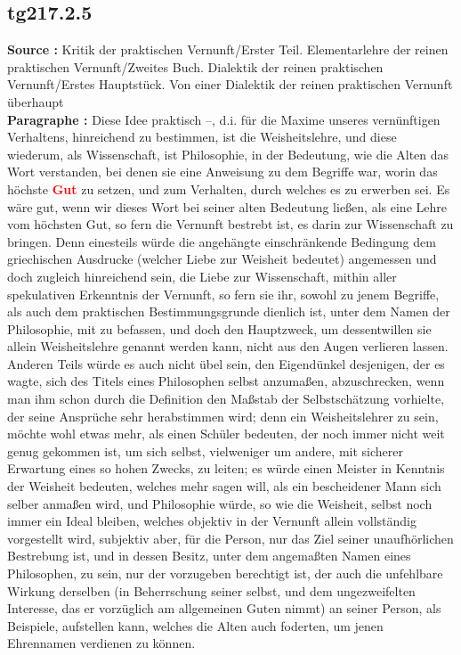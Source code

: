 \documentclass[a4paper,12pt,twoside]{book}
\newcommand{\match}[1]{\textcolor{red}{\textbf{#1}}}
\begin{document}
	\subsection*{tg217.2.5} 
	\textbf{Source : }Kritik der praktischen Vernunft/Erster Teil. Elementarlehre der reinen praktischen Vernunft/Zweites Buch. Dialektik der reinen praktischen Vernunft/Erstes Hauptstück. Von einer Dialektik der reinen praktischen Vernunft überhaupt\\  
	
	\noindent\textbf{Paragraphe : }Diese Idee praktisch –, d.i. für die Maxime unseres vernünftigen Verhaltens, hinreichend zu bestimmen, ist die 
	Weisheitslehre, und diese wiederum, als Wissenschaft, ist Philosophie, in der Bedeutung, wie die Alten das Wort verstanden, bei denen sie eine Anweisung zu dem Begriffe war, worin das höchste \match{Gut} zu setzen, und zum Verhalten, durch welches es zu erwerben sei. Es wäre gut, wenn wir dieses Wort bei seiner alten Bedeutung ließen, als eine Lehre vom höchsten Gut, so fern die Vernunft bestrebt ist, es darin zur Wissenschaft zu bringen. Denn einesteils würde die angehängte einschränkende Bedingung dem griechischen Ausdrucke (welcher Liebe zur Weisheit bedeutet) angemessen und doch zugleich hinreichend sein, die Liebe zur Wissenschaft, mithin aller spekulativen Erkenntnis der Vernunft, so fern sie ihr, sowohl zu jenem Begriffe, als auch dem praktischen Bestimmungsgrunde dienlich ist, unter dem Namen der Philosophie, mit zu befassen, und doch den Hauptzweck, um dessentwillen sie allein Weisheitslehre genannt werden kann, nicht aus den Augen verlieren lassen. Anderen Teils würde es auch nicht übel sein, den Eigendünkel desjenigen, der es wagte, sich des Titels eines Philosophen selbst anzumaßen, abzuschrecken, wenn man ihm schon durch die Definition den Maßstab der Selbstschätzung vorhielte, der seine Ansprüche sehr herabstimmen wird; denn ein Weisheitslehrer zu sein, möchte wohl etwas mehr, als einen Schüler bedeuten, der noch immer nicht weit genug gekommen ist, um sich selbst, vielweniger um andere, mit sicherer Erwartung eines so hohen Zwecks, zu leiten; es würde einen Meister in Kenntnis der Weisheit bedeuten, welches mehr sagen will, als ein bescheidener Mann sich selber anmaßen wird, und Philosophie würde, so wie die Weisheit, selbst noch immer ein Ideal bleiben, welches objektiv in der Vernunft allein vollständig vorgestellt wird, subjektiv aber, für die Person, nur das Ziel seiner unaufhörlichen Bestrebung ist, und in dessen Besitz, unter dem angemaßten Namen eines Philosophen, zu sein, nur der vorzugeben berechtigt ist, der auch die unfehlbare Wirkung derselben (in Beherrschung seiner selbst, und dem ungezweifelten Interesse, das er vorzüglich am allgemeinen Guten nimmt) an seiner Person, als Beispiele, aufstellen kann, welches die Alten auch foderten, um jenen Ehrennamen verdienen zu können. 
	
\end{document}
